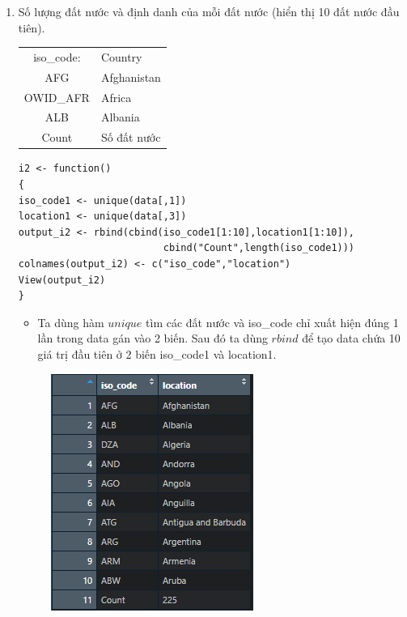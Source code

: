 \documentclass[a4paper]{article}
\theoremstyle{definition}
\begin{document}
\begin{enumerate}[i)]
\begin{enumerate}[1)]
		\item Số lượng đất nước và định danh của mỗi đất nước (hiển thị 10 đất nước đầu tiên).
		\begin{center}
			\begin{tabular}{ c l }
				iso\_code: & Country \\ 
				AFG & Afghanistan  \\ 
				OWID\_AFR & Africa \\
				ALB & Albania\\ 
				Count & Số đất nước
			\end{tabular}
		\end{center}
		
	\begin{lstlisting}[frame=single]  
i2 <- function()
{
iso_code1 <- unique(data[,1])
location1 <- unique(data[,3])
output_i2 <- rbind(cbind(iso_code1[1:10],location1[1:10]),
                         cbind("Count",length(iso_code1)))
colnames(output_i2) <- c("iso_code","location")
View(output_i2)
}
	\end{lstlisting}
	\begin{itemize}
    \item Ta dùng hàm $unique$ tìm các đất nước và iso\_code chỉ xuất hiện đúng 1 lần trong data gán vào 2 biến. Sau đó ta dùng $rbind$ để tạo data chứa 10 giá trị đầu tiên ở 2 biến iso\_code1 và location1.
\end{itemize}
	\begin{figure}[h!]
		\begin{center}
		    \includegraphics[scale=0.8]{Images/I/I2.png}
		\end{center}
	\end{figure}
	

\end{enumerate}
\end{enumerate}
\end{document}
